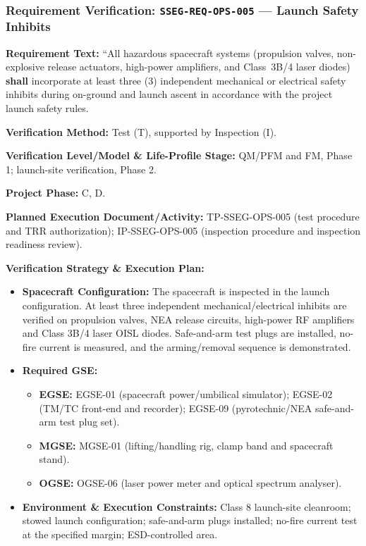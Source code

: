 \subsubsection{Requirement Verification: \texttt{SSEG-REQ-OPS-005} --- Launch Safety Inhibits}
\label{ver:SSEG-REQ-OPS-005}
\textbf{Requirement Text:} ``All hazardous spacecraft systems (propulsion valves, non-explosive release actuators, high-power  amplifiers, and Class~3B/4 laser  diodes) \textbf{shall} incorporate at least three (3) independent mechanical or electrical safety inhibits during on-ground  and launch ascent in accordance with the project launch safety rules.
\par\textbf{Verification Method:} Test (T), supported by Inspection (I).
\par\textbf{Verification Level/Model \& Life-Profile Stage:} QM/PFM and FM, Phase 1; launch-site verification, Phase 2.
\par\textbf{Project Phase:} C, D.
\par\textbf{Planned Execution Document/Activity:} TP-SSEG-OPS-005 (test procedure and TRR authorization); IP-SSEG-OPS-005 (inspection procedure and inspection readiness review).
\par\textbf{Verification Strategy \& Execution Plan:}
\begin{itemize}
\item \textbf{Spacecraft Configuration:} The spacecraft is inspected in the launch configuration. At least three independent mechanical/electrical inhibits are verified on propulsion valves, NEA release circuits, high-power RF amplifiers and Class 3B/4 laser OISL diodes. Safe-and-arm test plugs are installed, no-fire current is measured, and the arming/removal sequence is demonstrated.
\item \textbf{Required GSE:}
\begin{itemize}
\item \textbf{EGSE:} EGSE-01 (spacecraft power/umbilical simulator); EGSE-02 (TM/TC front-end and recorder); EGSE-09 (pyrotechnic/NEA safe-and-arm test plug set).
\item \textbf{MGSE:} MGSE-01 (lifting/handling rig, clamp band and spacecraft stand).
\item \textbf{OGSE:} OGSE-06 (laser power meter and optical spectrum analyser).
\end{itemize}
\item \textbf{Environment \& Execution Constraints:} Class 8 launch-site cleanroom; stowed launch configuration; safe-and-arm plugs installed; no-fire current test at the specified margin; ESD-controlled area.
\end{itemize}
